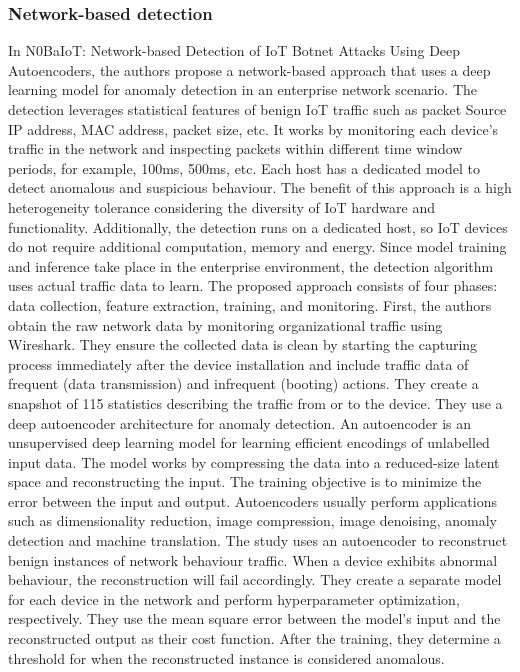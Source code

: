 \documentclass[conference, 11pt]{IEEEtran}
\begin{document}
\subsubsection{Network-based detection}
In N0BaIoT: Network-based Detection of IoT Botnet Attacks Using Deep Autoencoders, the authors propose a network-based approach that uses a deep learning model for anomaly detection in an enterprise network scenario.
The detection leverages statistical features of benign IoT traffic such as packet Source IP address, MAC address, packet size, etc.
It works by monitoring each device's traffic in the network and inspecting packets within different time window periods, for example, 100ms, 500ms, etc.
Each host has a dedicated model to detect anomalous and suspicious behaviour.
The benefit of this approach is a high heterogeneity tolerance considering the diversity of IoT hardware and functionality.
Additionally, the detection runs on a dedicated host, so IoT devices do not require additional computation, memory and energy.
Since model training and inference take place in the enterprise environment, the detection algorithm uses actual traffic data to learn.
The proposed approach consists of four phases: data collection, feature extraction, training, and monitoring.
First, the authors obtain the raw network data by monitoring organizational traffic using Wireshark.
They ensure the collected data is clean by starting the capturing process immediately after the device installation and include traffic data of frequent (data transmission) and infrequent (booting) actions.
They create a snapshot of 115 statistics describing the traffic from or to the device. They use a deep autoencoder architecture for anomaly detection.
An autoencoder is an unsupervised deep learning model for learning efficient encodings of unlabelled input data.
The model works by compressing the data into a reduced-size latent space and reconstructing the input.
The training objective is to minimize the error between the input and output.
Autoencoders usually perform applications such as dimensionality reduction, image compression, image denoising, anomaly detection and machine translation.
The study uses an autoencoder to reconstruct benign instances of network behaviour traffic. When a device exhibits abnormal behaviour, the reconstruction will fail accordingly.
They create a separate model for each device in the network and perform hyperparameter optimization, respectively.
They use the mean square error between the model's input and the reconstructed output as their cost function.
After the training, they determine a threshold for when the reconstructed instance is considered anomalous.
\end{document}

